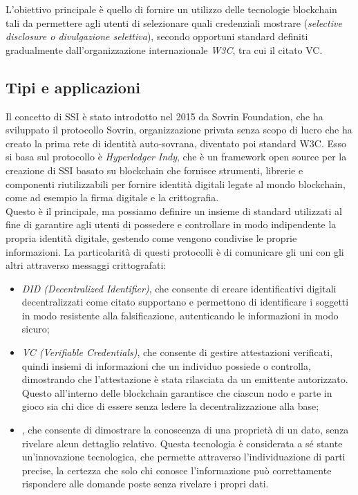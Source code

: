 L'obiettivo principale è quello di fornire un utilizzo delle tecnologie blockchain tali da permettere agli utenti 
di selezionare quali credenziali mostrare (\textit{selective disclosure o divulgazione selettiva}),
secondo opportuni standard definiti gradualmente dall'organizzazione internazionale \textit{W3C}, tra cui il citato VC.\@

\subsection{Tipi e applicazioni}\label{sec:self-sovereign-identity-tipi-applicazioni}

Il concetto di SSI è stato introdotto nel 2015 da Sovrin Foundation, che ha sviluppato il protocollo Sovrin,
organizzazione privata senza scopo di lucro che ha creato la prima rete di identità auto-sovrana, diventato poi standard W3C. 
Esso si basa sul protocollo è \textit{Hyperledger Indy}, che è un framework open source per la creazione di SSI basato su blockchain
che fornisce strumenti, librerie e componenti riutilizzabili per fornire identità digitali legate al mondo blockchain, 
come ad esempio la firma digitale e la crittografia. \\

Questo è il principale, ma possiamo definire un insieme di standard 
utilizzati al fine di garantire agli utenti di possedere e controllare in modo indipendente la propria identità digitale, gestendo come vengono
condivise le proprie informazioni. La particolarità di questi protocolli è di comunicare gli uni con gli altri attraverso messaggi crittografati:
\begin{itemize}
    \item \textit{DID (Decentralized Identifier)}, che consente di creare identificativi digitali decentralizzati come citato supportano
    e permettono di identificare i soggetti in modo resistente alla falsificazione, autenticando le informazioni in modo sicuro;
    \item \textit{VC (Verifiable Credentials)}, che consente di gestire attestazioni verificati, quindi insiemi di informazioni che un individuo
    possiede o controlla, dimostrando che l'attestazione è stata rilasciata da un emittente autorizzato. Questo all'interno delle blockchain
    garantisce che ciascun nodo e parte in gioco sia chi dice di essere senza ledere la decentralizzazione alla base;
    \item {}, che consente di dimostrare la conoscenza di una proprietà di un dato, senza rivelare alcun dettaglio relativo.
    Questa tecnologia è considerata a sé stante un'innovazione tecnologica, che permette attraverso l'individuazione di parti precise,
    la certezza che solo chi conosce l'informazione può correttamente rispondere alle domande poste senza rivelare i propri dati.
\end{itemize}

